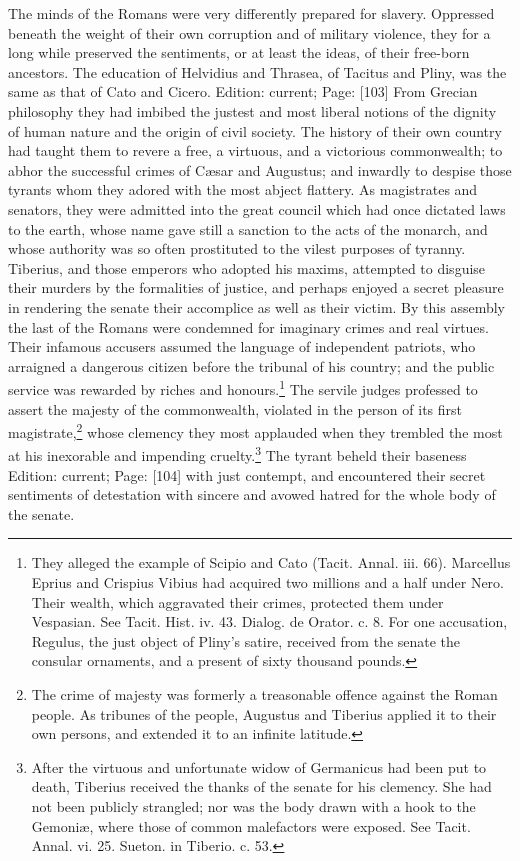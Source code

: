 The minds of the Romans were very differently prepared for slavery. Oppressed beneath the weight of their own corruption and of military violence, they for a long while preserved the sentiments, or at least the ideas, of their free-born ancestors. The education of Helvidius and Thrasea, of Tacitus and Pliny, was the same as that of Cato and Cicero. Edition: current; Page: [103] From Grecian philosophy they had imbibed the justest and most liberal notions of the dignity of human nature and the origin of civil society. The history of their own country had taught them to revere a free, a virtuous, and a victorious commonwealth; to abhor the successful crimes of Cæsar and Augustus; and inwardly to despise those tyrants whom they adored with the most abject flattery. As magistrates and senators, they were admitted into the great council which had once dictated laws to the earth, whose name gave still a sanction to the acts of the monarch, and whose authority was so often prostituted to the vilest purposes of tyranny. Tiberius, and those emperors who adopted his maxims, attempted to disguise their murders by the formalities of justice, and perhaps enjoyed a secret pleasure in rendering the senate their accomplice as well as their victim. By this assembly the last of the Romans were condemned for imaginary crimes and real virtues. Their infamous accusers assumed the language of independent patriots, who arraigned a dangerous citizen before the tribunal of his country; and the public service was rewarded by riches and honours.\footnote{They alleged the example of Scipio and Cato (Tacit. Annal. iii. 66). Marcellus Eprius and Crispius Vibius had acquired two millions and a half under Nero. Their wealth, which aggravated their crimes, protected them under Vespasian. See Tacit. Hist. iv. 43. Dialog. de Orator. c. 8. For one accusation, Regulus, the just object of Pliny\texthebrew{}’s satire, received from the senate the consular ornaments, and a present of sixty thousand pounds.} The servile judges professed to assert the majesty of the commonwealth, violated in the person of its first magistrate,\footnote{The crime of majesty was formerly a treasonable offence against the Roman people. As tribunes of the people, Augustus and Tiberius applied it to their own persons, and extended it to an infinite latitude.} whose clemency they most applauded when they trembled the most at his inexorable and impending cruelty.\footnote{After the virtuous and unfortunate widow of Germanicus had been put to death, Tiberius received the thanks of the senate for his clemency. She had not been publicly strangled; nor was the body drawn with a hook to the Gemoniæ, where those of common malefactors were exposed. See Tacit. Annal. vi. 25. Sueton. in Tiberio. c. 53.} The tyrant beheld their baseness Edition: current; Page: [104] with just contempt, and encountered their secret sentiments of detestation with sincere and avowed hatred for the whole body of the senate.

